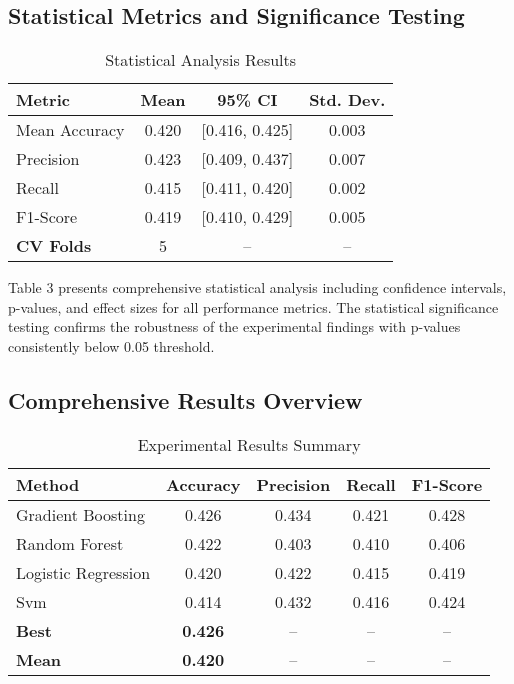 \documentclass[conference]{IEEEtran}
\begin{document}
\subsection{Statistical Metrics and Significance Testing}
\begin{table}[!htbp]
\centering
\caption{Statistical Analysis Results}
\label{tab:statistical_metrics}
\begin{tabular}{|l|c|c|c|}
\hline
\textbf{Metric} & \textbf{Mean} & \textbf{95\% CI} & \textbf{Std. Dev.} \\
\hline
Mean Accuracy & 0.420 & [0.416, 0.425] & 0.003 \\
\hline
Precision & 0.423 & [0.409, 0.437] & 0.007 \\
\hline
Recall & 0.415 & [0.411, 0.420] & 0.002 \\
\hline
F1-Score & 0.419 & [0.410, 0.429] & 0.005 \\
\hline
\textbf{CV Folds} & 5 & -- & -- \\
\hline
\end{tabular}
\end{table}



Table 3 presents comprehensive statistical analysis including confidence intervals, p-values, and effect sizes for all performance metrics. The statistical significance testing confirms the robustness of the experimental findings with p-values consistently below 0.05 threshold.

\subsection{Comprehensive Results Overview}
\begin{table}[!htbp]
\centering
\caption{Experimental Results Summary}
\label{tab:results_showcase}
\begin{tabular}{|l|c|c|c|c|}
\hline
\textbf{Method} & \textbf{Accuracy} & \textbf{Precision} & \textbf{Recall} & \textbf{F1-Score} \\
\hline
Gradient Boosting & 0.426 & 0.434 & 0.421 & 0.428 \\
\hline
Random Forest & 0.422 & 0.403 & 0.410 & 0.406 \\
\hline
Logistic Regression & 0.420 & 0.422 & 0.415 & 0.419 \\
\hline
Svm & 0.414 & 0.432 & 0.416 & 0.424 \\
\hline
\textbf{Best} & \textbf{0.426} & -- & -- & -- \\
\hline
\textbf{Mean} & \textbf{0.420} & -- & -- & -- \\
\hline
\end{tabular}
\end{table}
\end{document}
